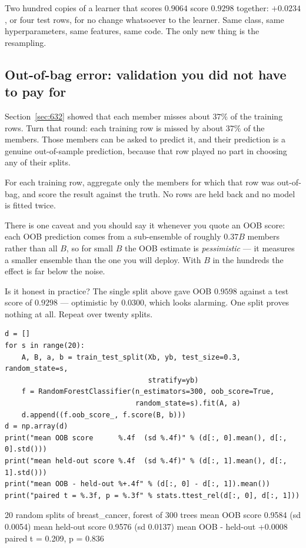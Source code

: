 \documentclass[11pt]{article}
\begin{document}
Two hundred copies of a learner that scores $0.9064$ score $0.9298$ together:
$+0.0234$, or four test rows, for no change whatsoever to the learner. Same
class, same hyperparameters, same features, same code. The only new thing is
the resampling.

\subsection{Out-of-bag error: validation you did not have to pay for}
\label{sec:oob}

Section~\ref{sec:632} showed that each member misses about $37\%$ of the
training rows. Turn that round: each training row is missed by about $37\%$ of
the members. Those members can be asked to predict it, and their prediction is
a genuine out-of-sample prediction, because that row played no part in
choosing any of their splits.

\begin{keyidea}
For each training row, aggregate only the members for which that row was
out-of-bag, and score the result against the truth. No rows are held back and
no model is fitted twice.
\end{keyidea}

There is one caveat and you should say it whenever you quote an OOB score:
each OOB prediction comes from a sub-ensemble of roughly $0.37B$ members
rather than all $B$, so for small $B$ the OOB estimate is \emph{pessimistic}
--- it measures a smaller ensemble than the one you will deploy. With $B$ in
the hundreds the effect is far below the noise.

Is it honest in practice? The single split above gave OOB $0.9598$ against a
test score of $0.9298$ --- optimistic by $0.0300$, which looks alarming. One
split proves nothing at all. Repeat over twenty splits.

\begin{lstlisting}
d = []
for s in range(20):
    A, B, a, b = train_test_split(Xb, yb, test_size=0.3, random_state=s,
                                  stratify=yb)
    f = RandomForestClassifier(n_estimators=300, oob_score=True,
                               random_state=s).fit(A, a)
    d.append((f.oob_score_, f.score(B, b)))
d = np.array(d)
print("mean OOB score      %.4f  (sd %.4f)" % (d[:, 0].mean(), d[:, 0].std()))
print("mean held-out score %.4f  (sd %.4f)" % (d[:, 1].mean(), d[:, 1].std()))
print("mean OOB - held-out %+.4f" % (d[:, 0] - d[:, 1]).mean())
print("paired t = %.3f, p = %.3f" % stats.ttest_rel(d[:, 0], d[:, 1]))
\end{lstlisting}
\begin{codeout}
20 random splits of breast_cancer, forest of 300 trees
mean OOB score      0.9584  (sd 0.0054)
mean held-out score 0.9576  (sd 0.0137)
mean OOB - held-out +0.0008
paired t = 0.209, p = 0.836
\end{codeout}
\end{document}
